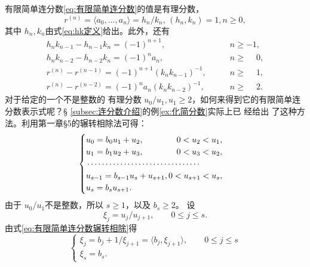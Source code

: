 \begin{theorem}
	有限简单连分数\eqref{eq:有限简单连分数}的值是有理分数，
	\begin{equation}
		r^{(n)} = \langle a_0, \dots, a_n \rangle = h_n/k_n,\, \left(h_n, k_n\right) = 1, n \ge 0,
	\end{equation}
	其中 \( h_n, k_n \)由式\eqref{eq:hk定义}给出。此外，还有
	\begin{align}
		h_nk_{n-1} - h_{n-1}k_n = (-1)^{n+1}, \qquad               & n \ge -1,           \\
		h_nk_{n-2} - h_{n-2}k_n = (-1)^{n}a_n, \qquad              & n \ge \phantom{-}0, \\
		r^{(n)} - r^{(n-1)} = (-1)^{n+1}(k_nk_{n-1})^{-1}, \qquad  & n \ge \phantom{-}1, \\
		r^{(n)} - r^{(n-2)} = (-1)^{n}a_n(k_nk_{n-2})^{-1}, \qquad & n \ge \phantom{-}2.
	\end{align}
	对于给定的一个不是整数的 有理分数 \( u_0 / u_1, u_1 \ge 2 \)，如何来得到它的有限简单连分数表示式呢？\S
	\ref{subsec:连分数介绍}的例\ref{ex:化简分数}实际上已 经给出 了这种方法。利用第一章§5的辗转相除法可得：
	\begin{equation}\label{eq:有限简单连分数辗转相除}
		\begin{cases}
			u_0 = b_0 u_1 + u_2, \hfill              0 < u_2 < u_1,     \\
			u_1 = b_1 u_2 + u_3, \hfill              0 < u_3 < u_2,     \\
			\begin{minipage}{0.4\textwidth}
				\dotfill
			\end{minipage}                              \\
			u_{s-1} = b_{s-1} u_s + u_{s+1}, \hfill  0 < u_{s+1} < u_s, \\
			u_s = b_s u_{s+1}. \hfill
		\end{cases}
	\end{equation}
	由于 \( u_0 / u_1 \)不是整数，所以 \( s \ge 1 \)，以及 \( b_s \ge 2 \)。 设
	\begin{equation}
		\xi_j = u_j / u_{j+1}, \qquad 0 \le j \le s.
	\end{equation}
	由式\eqref{eq:有限简单连分数辗转相除}得
	\begin{equation}
		\begin{cases}
			\xi_j = b_j + 1 / \xi_{j + 1} = \langle b_j, \xi_{j+1} \rangle, \qquad 0 \le j \le s \\
			\xi_s = b_s.
		\end{cases}
	\end{equation}

\end{theorem}
